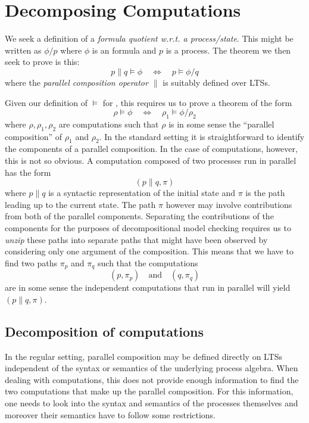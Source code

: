 \section{Decomposing Computations} %
\label{sec:decomp_comp}

We seek a definition of a \emph{formula quotient w.r.t. a process/state}.
This might be written as $\phi / p$ where $\phi$ is an \HMLpast{} formula
and $p$ is a process. The theorem we then seek to prove is this:
\[
    p \parallel q \vDash \phi  \quad\Leftrightarrow\quad p \vDash \phi / q
\]
where the \emph{parallel composition operator $\parallel$} is suitably defined
over LTSs.

Given our definition of $\vDash$ for \HMLpast, this requires us to prove
a theorem of the form
\[
    \rho \vDash \phi  \quad\Leftrightarrow\quad \rho_1 \vDash \phi / \rho_2
\]
where $\rho,\rho_1,\rho_2$ are computations such that $\rho$ is in some sense
the ``parallel composition'' of $\rho_1$ and $\rho_2$. In the 
standard setting it is straightforward to identify the components of a
parallel composition. In the case of computations, however, this is not so
obvious. A computation composed of two processes run in parallel has the form
\[
    (p\parallel q, \pi)
\]
where $p\parallel q$ is a syntactic representation of the initial state and
$\pi$ is the path leading up to the current state. The path $\pi$ however
may involve contributions from both of the parallel components.
Separating the contributions of the components
for the purposes of decompositional model checking requires us to \emph{unzip}
these paths into separate paths that might have been observed by considering
only one argument of the composition. This means that we have to find two paths $\pi_p$
and $\pi_q$ such that the computations
\[
    (p, \pi_p) \quad\textrm{and}\quad (q, \pi_q)
\]
are in some sense the independent computations that run in parallel will
yield $(p\parallel q, \pi)$.


\subsection{Decomposition of computations} %
\label{sub:decomposition_of_computations}

In the regular setting, parallel composition may be defined 
directly on LTSs independent
of the syntax or semantics of the underlying process algebra. When dealing
with computations, this does not provide enough information to find the two
computations that make up the parallel composition. For this information, one
needs to look into the syntax and semantics of the processes themselves and
moreover their semantics have to follow some restrictions.

